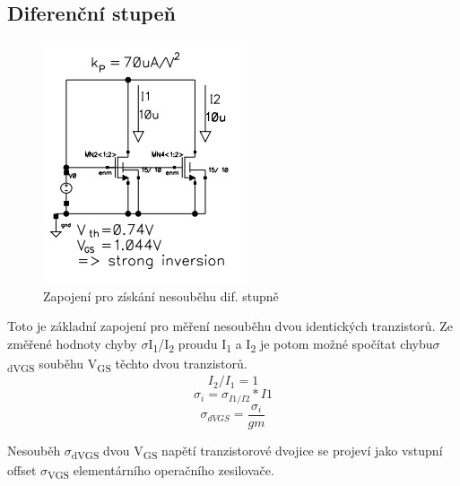 \subsection{Diferenční stupeň}
\begin{figure}[h]
   \begin{center}
     \includegraphics[scale=0.6]{images/MOS6.png}
   \end{center}
   \caption{Zapojení pro získání nesouběhu dif. stupně}
\end{figure}

Toto je základní zapojení pro měření nesouběhu dvou identických tranzistorů. Ze změřené hodnoty  chyby $\sigma$I\textsubscript{1}/I\textsubscript{2} proudu I\textsubscript{1} a I\textsubscript{2} je potom možné spočítat chybu$\sigma$\textsubscript{dVGS} souběhu V\textsubscript{GS} těchto dvou tranzistorů.
\begin{equation}
I_{2}/I_{1} = 1
\end{equation}
\begin{equation}
\sigma_{i}=\sigma_{I1/I2}*I1
\end{equation}
\begin{equation}
\sigma_{dVGS}=\frac{\sigma_{i}}{gm}
\end{equation}

Nesouběh $\sigma$\textsubscript{dVGS} dvou V\textsubscript{GS} napětí tranzistorové dvojice se projeví jako vstupní offset $\sigma$\textsubscript{VGS} elementárního operačního zesilovače.
\newpage
